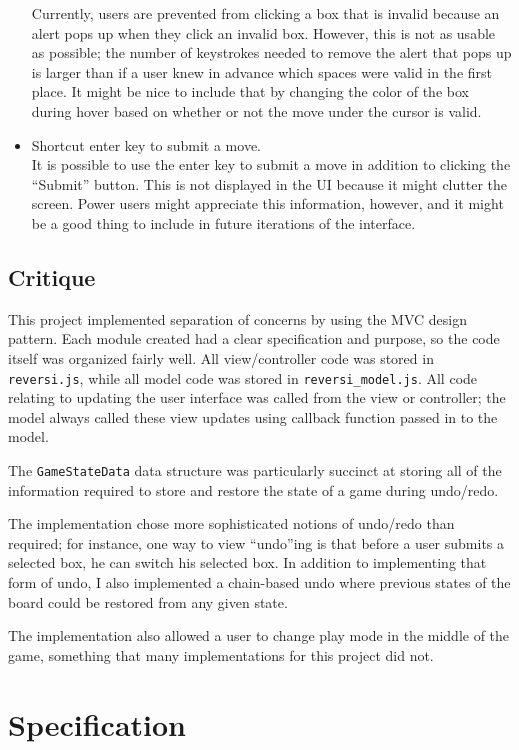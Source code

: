 \documentclass[11pt,letterpaper]{article}
\begin{document}
\begin{itemize}
Currently, users are prevented from clicking a box that is invalid because an alert pops up when they click an invalid box. However, this is not as usable as possible; the number of keystrokes needed to remove the alert that pops up is larger than if a user knew in advance which spaces were valid in the first place. It might be nice to include that by changing the color of the box during hover based on whether or not the move under the cursor is valid.
\item Shortcut enter key to submit a move.\\
It is possible to use the enter key to submit a move in addition to clicking the ``Submit'' button. This is not displayed in the UI because it might clutter the screen. Power users might appreciate this information, however, and it might be a good thing to include in future iterations of the interface.
\end{itemize}

\subsection{Critique}
This project implemented separation of concerns by using the MVC design pattern. Each module created had a clear specification and purpose, so the code itself was organized fairly well. All view/controller code was stored in \texttt{reversi.js}, while all model code was stored in \texttt{reversi\_model.js}. All code relating to updating the user interface was called from the view or controller; the model always called these view updates using callback function passed in to the model.

The \texttt{GameStateData} data structure was particularly succinct at storing all of the information required to store and restore the state of a game during undo/redo.

The implementation chose more sophisticated notions of undo/redo than required; for instance, one way to view ``undo''ing is that before a user submits a selected box, he can switch his selected box. In addition to implementing that form of undo, I also implemented a chain-based undo where previous states of the board could be restored from any given state.

The implementation also allowed a user to change play mode in the middle of the game, something that many implementations for this project did not.
\section{Specification}
\end{document}
